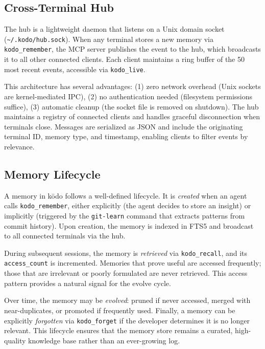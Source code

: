 \documentclass{article}
\begin{document}
\subsection{Cross-Terminal Hub}
\label{sec:hub}

The hub is a lightweight daemon that listens on a Unix domain socket (\texttt{\~{}/.kodo/hub.sock}). When any terminal stores a new memory via \texttt{kodo\_remember}, the MCP server publishes the event to the hub, which broadcasts it to all other connected clients. Each client maintains a ring buffer of the 50 most recent events, accessible via \texttt{kodo\_live}.

This architecture has several advantages: (1) zero network overhead (Unix sockets are kernel-mediated IPC), (2) no authentication needed (filesystem permissions suffice), (3) automatic cleanup (the socket file is removed on shutdown). The hub maintains a registry of connected clients and handles graceful disconnection when terminals close. Messages are serialized as JSON and include the originating terminal ID, memory type, and timestamp, enabling clients to filter events by relevance.

\subsection{Memory Lifecycle}
\label{sec:lifecycle}

A memory in k\=odo follows a well-defined lifecycle. It is \emph{created} when an agent calls \texttt{kodo\_remember}, either explicitly (the agent decides to store an insight) or implicitly (triggered by the \texttt{git-learn} command that extracts patterns from commit history). Upon creation, the memory is indexed in FTS5 and broadcast to all connected terminals via the hub.

During subsequent sessions, the memory is \emph{retrieved} via \texttt{kodo\_recall}, and its \texttt{access\_count} is incremented. Memories that prove useful are accessed frequently; those that are irrelevant or poorly formulated are never retrieved. This access pattern provides a natural signal for the evolve cycle.

Over time, the memory may be \emph{evolved}: pruned if never accessed, merged with near-duplicates, or promoted if frequently used. Finally, a memory can be explicitly \emph{forgotten} via \texttt{kodo\_forget} if the developer determines it is no longer relevant. This lifecycle ensures that the memory store remains a curated, high-quality knowledge base rather than an ever-growing log.
\end{document}
